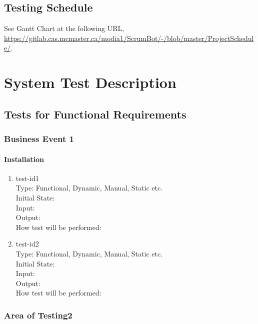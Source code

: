 \documentclass[12pt, titlepage]{article}
\begin{document}
\subsection{Testing Schedule}
See Gantt Chart at the following URL, \url{https://gitlab.cas.mcmaster.ca/modia1/ScrumBot/-/blob/master/ProjectSchedule/}.

\section{System Test Description}
\subsection{Tests for Functional Requirements}

\subsubsection{Business Event 1}
		
\paragraph{Installation}

\begin{enumerate}

\item{test-id1}\\
Type: Functional, Dynamic, Manual, Static etc.\\
Initial State: \\
Input: \\
Output: \\
How test will be performed: \\

\item{test-id2}\\
Type: Functional, Dynamic, Manual, Static etc.\\
Initial State: \\
Input: \\
Output: \\
How test will be performed: \\

\end{enumerate}

\subsubsection{Area of Testing2}
\end{document}
